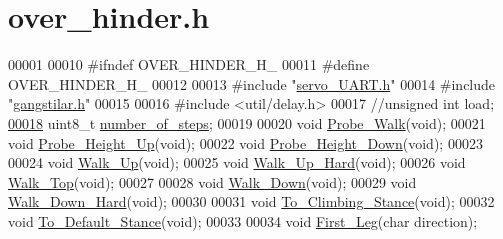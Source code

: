 \hypertarget{over__hinder_8h_source}{}\section{over\+\_\+hinder.\+h}
\label{over__hinder_8h_source}

\begin{DoxyCode}
00001 
00010 \textcolor{preprocessor}{#ifndef OVER\_HINDER\_H\_}
00011 \textcolor{preprocessor}{#define OVER\_HINDER\_H\_}
00012 
00013 \textcolor{preprocessor}{#include "\hyperlink{servo___u_a_r_t_8h}{servo\_UART.h}"}
00014 \textcolor{preprocessor}{#include "\hyperlink{gangstilar_8h}{gangstilar.h}"}
00015 
00016 \textcolor{preprocessor}{#include <util/delay.h>}
00017 \textcolor{comment}{//unsigned int load;}
\hypertarget{over__hinder_8h_source.tex_l00018}{}\hyperlink{over__hinder_8h_a33e442d1e9bcd95b56d24846c1aae3e9}{00018} uint8\_t \hyperlink{over__hinder_8h_a33e442d1e9bcd95b56d24846c1aae3e9}{number\_of\_steps};
00019 
00020 \textcolor{keywordtype}{void} \hyperlink{over__hinder_8h_a87539371f190ccc752119c0b325da463}{Probe\_Walk}(\textcolor{keywordtype}{void});
00021 \textcolor{keywordtype}{void} \hyperlink{over__hinder_8h_ae91da6f3d3729d04dbd82cb672c8b690}{Probe\_Height\_Up}(\textcolor{keywordtype}{void}); 
00022 \textcolor{keywordtype}{void} \hyperlink{over__hinder_8h_a50e10d9ae7ed457b8aade307c11efbe4}{Probe\_Height\_Down}(\textcolor{keywordtype}{void}); 
00023 
00024 \textcolor{keywordtype}{void} \hyperlink{over__hinder_8h_ac5e595f6e488678c5e18cb3fd9364fb3}{Walk\_Up}(\textcolor{keywordtype}{void}); 
00025 \textcolor{keywordtype}{void} \hyperlink{over__hinder_8h_ae7231a80aafc83676e934f016d681783}{Walk\_Up\_Hard}(\textcolor{keywordtype}{void});
00026 \textcolor{keywordtype}{void} \hyperlink{over__hinder_8h_a6f7053ec3f149f4974cb94362739f7bc}{Walk\_Top}(\textcolor{keywordtype}{void});
00027 
00028 \textcolor{keywordtype}{void} \hyperlink{over__hinder_8h_aad65c7e9222750ff718f2a9ccaa2a11c}{Walk\_Down}(\textcolor{keywordtype}{void}); 
00029 \textcolor{keywordtype}{void} \hyperlink{over__hinder_8h_ace3a300d120d3dfcf42a787a4cea14f9}{Walk\_Down\_Hard}(\textcolor{keywordtype}{void});
00030 
00031 \textcolor{keywordtype}{void} \hyperlink{over__hinder_8h_a721328d45f539a2d4caecc7d5726fc88}{To\_Climbing\_Stance}(\textcolor{keywordtype}{void});
00032 \textcolor{keywordtype}{void} \hyperlink{over__hinder_8h_aa1749474a1fb3aa13b681498eb340fc7}{To\_Default\_Stance}(\textcolor{keywordtype}{void});
00033 
00034 \textcolor{keywordtype}{void} \hyperlink{over__hinder_8h_a8e93e827f047dac258e8334869fb2615}{First\_Leg}(\textcolor{keywordtype}{char} direction);

\end{DoxyCode}
